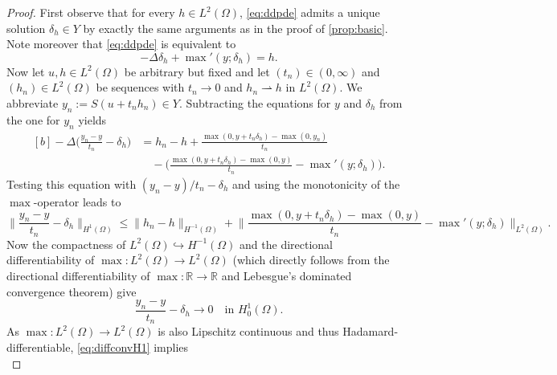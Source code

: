 \documentclass[reqno]{shinyart}
\begin{document}
\begin{proof}
    First observe that for every $h\in L^2(\Omega)$, \eqref{eq:ddpde} admits a unique solution 
    $\delta_h \in Y$ by exactly the same arguments as in the proof of \cref{prop:basic}. 
    Note moreover that \eqref{eq:ddpde} is equivalent to
    \begin{equation*}
        - \Delta \delta_h +  {\max\nolimits}'(y;\delta_h) = h.
    \end{equation*}
    Now let $u, h \in L^2(\Omega)$ be arbitrary but fixed 
    and let $(t_n) \in (0, \infty)$ and $(h_n) \in L^2(\Omega)$ be sequences with $t_n \to 0$ and $h_n {\rightharpoonup} h$ in $L^2(\Omega)$. 
    We abbreviate $y_n := S(u + t_n h_n) \in Y$. Subtracting the equations for $y$ and $\delta_h$ from the one for $y_n$ yields
    \begin{equation}\label{eq:diffquotpde}
        \begin{aligned}[b]
            -\Delta \Big( \frac{y_n - y}{t_n} - \delta_h \Big) 
            & =  h_n - h + \frac{\max(0,y + t_n \delta_h) - \max(0,y_n)}{t_n} \\[-1mm]
            & \quad - \Big(\frac{\max(0,y + t_n \delta_h) - \max(0,y)}{t_n} - {\max\nolimits}'(y;\delta_h)\Big).
        \end{aligned}
    \end{equation}  
    Testing this equation with $(y_n - y)/t_n - \delta_h$ and using the monotonicity of the $\max$-operator leads to
    \begin{equation*}
        \Big\| \frac{y_n - y}{t_n} - \delta_h \Big\|_{H^1(\Omega)} 
        \leq \| h_n - h\|_{H^{-1}(\Omega)} 
        + \Big\|\frac{\max(0,y + t_n \delta_h) - \max(0,y)}{t_n} - {\max\nolimits}'(y;\delta_h)\Big\|_{L^2(\Omega)}.
    \end{equation*}
    Now the compactness of $L^2(\Omega) {\hookrightarrow} H^{-1}(\Omega)$ and the 
    directional differentiability of $\max: L^2(\Omega) \to L^2(\Omega)$ (which directly follows 
    from the directional differentiability of $\max: {\mathbb{R}} \to {\mathbb{R}}$ and Lebesgue's dominated 
    convergence theorem) give
    \begin{equation}\label{eq:diffconvH1}
        \frac{y_n - y}{t_n} - \delta_h \to 0 \quad \text{in } H^1_0(\Omega).
    \end{equation}
    As $\max: L^2(\Omega) \to L^2(\Omega)$ is also Lipschitz continuous and thus Hadamard-differentiable, 
    \eqref{eq:diffconvH1} implies 
    \begin{equation}\label{eq:maxhadamard}

\end{equation}
\end{proof}
\end{document}
